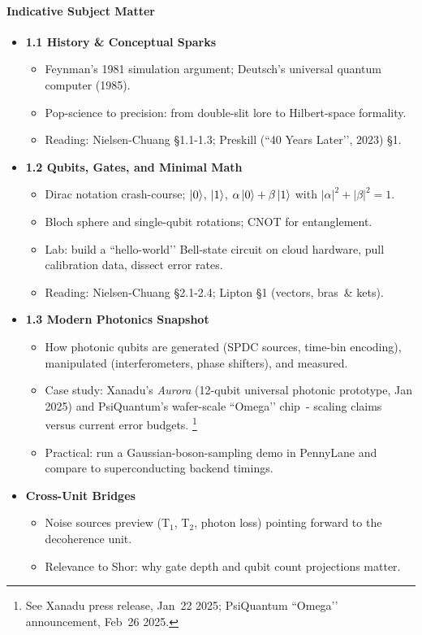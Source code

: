 \documentclass[11pt,a4paper]{article}
\begin{document}
\paragraph{Indicative Subject Matter}
\begin{itemize}
	\item \textbf{1.1 History \& Conceptual Sparks}
	\begin{itemize}
		\item Feynman’s 1981 simulation argument; Deutsch’s universal quantum computer (1985).
		\item Pop-science to precision: from double-slit lore to Hilbert-space formality.
		\item Reading: Nielsen-Chuang §1.1-1.3; Preskill (``40 Years Later’’, 2023) §1.
	\end{itemize}
	\item \textbf{1.2 Qubits, Gates, and Minimal Math}
	\begin{itemize}
		\item Dirac notation crash-course; $\ket{0}$, $\ket{1}$, $\alpha\ket{0}+\beta\ket{1}$ with $\lvert\alpha\rvert^{2}+\lvert\beta\rvert^{2}=1$.
		\item Bloch sphere and single-qubit rotations; CNOT for entanglement.
		\item Lab: build a ``hello-world’’ Bell-state circuit on cloud hardware, pull calibration data, dissect error rates.
		\item Reading: Nielsen-Chuang §2.1-2.4; Lipton §1 (vectors, bras \& kets).
	\end{itemize}
	\item \textbf{1.3 Modern Photonics Snapshot}
	\begin{itemize}
		\item How photonic qubits are generated (SPDC sources, time-bin encoding), manipulated (interferometers, phase shifters), and measured.
		\item Case study: Xanadu’s \emph{Aurora} (12-qubit universal photonic prototype, Jan 2025) and PsiQuantum’s wafer-scale ``Omega’’ chip - scaling claims versus current error budgets.%
		\footnote{See Xanadu press release, Jan 22 2025; PsiQuantum ``Omega’’ announcement, Feb 26 2025.}
		\item Practical: run a Gaussian-boson-sampling demo in PennyLane and compare to superconducting backend timings.
	\end{itemize}
	\item \textbf{Cross-Unit Bridges}
	\begin{itemize}
		\item Noise sources preview (T$_1$, T$_2$, photon loss) pointing forward to the decoherence unit.
		\item Relevance to Shor: why gate depth and qubit count projections matter.
	\end{itemize}
\end{itemize}
\end{document}
